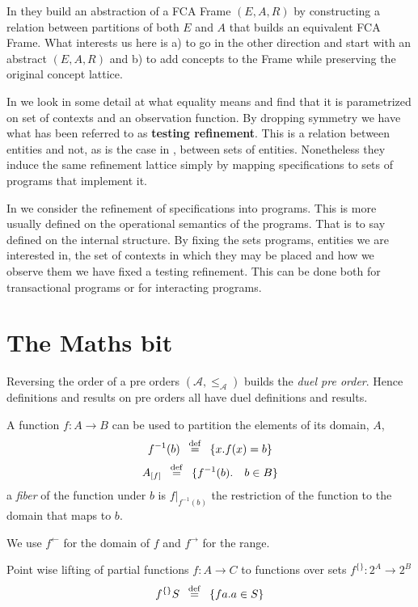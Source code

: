 In \cite{HFCA05} they build an  abstraction of a FCA Frame $(E,A,R)$ by constructing a relation between partitions of both $E$ and $A$ that builds an equivalent FCA Frame. What interests us here is a) to go in the other direction and start with an abstract $(E,A,R)$ and b) to add concepts  to the Frame while preserving the original concept lattice.

In  we look in some detail at what equality means and find that it is parametrized on set of contexts and an observation function. By dropping symmetry we have what has been referred to as {\bf testing refinement}. This is a relation between entities and not, as is the case in ,  between sets of entities.   Nonetheless they induce the same refinement lattice simply by mapping specifications to sets of programs that implement it. 

 In   we consider the refinement of specifications into programs. This is more usually defined on the operational semantics of the programs. That is to say defined on the internal structure. By fixing  the  sets programs, entities we are interested in, the set of contexts in which they may be placed and how we observe them we have fixed a testing refinement. This can be done both for transactional programs or for interacting programs. 




\section{The Maths bit}\label{sec:Math}

Reversing the order of a pre orders $ (\mathcal{A},\leq_\mathcal{A})$ builds the \emph{duel pre order}. Hence definitions and results on pre orders  all have duel definitions and results.

 A function $f:A\rightarrow B$ can be used to partition  the elements of its domain, $A$, 
 \[ f^{-1}(b)  \hspace*{0.5em} \stackrel{\mathrm{def}}{=} \hspace*{0.5em} \{ x. f(x)=b \}\]
 \[ A_{[f]}  \hspace*{0.5em} \stackrel{\mathrm{def}}{=} \hspace*{0.5em} \{ f^{-1}(b). \quad  b\in B    \}  \]
  a \emph{fiber} of the function under $b$ is $f|_{f^{-1}(b)}$ the restriction of the function to the domain that maps to $b$.
  
  We use $f^{\leftarrow}$ for the domain of $f$ and $f^{\rightarrow}$ for the range.

Point wise lifting of partial functions $f: A \rightarrow C$ to functions over sets $f^{\{\}}: 2^A \rightarrow 2^B$
\[f^{\{\}} S  \hspace*{0.5em} \stackrel{\mathrm{def}}{=} \hspace*{0.5em} \{f a .  a\in S \} \]



